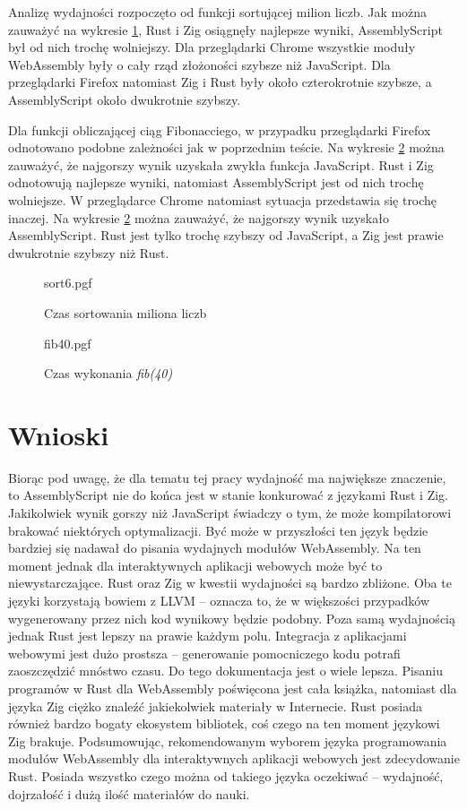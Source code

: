 \documentclass[language=polish,type=master]{aghmodern}
\begin{document}
Analizę wydajności rozpoczęto od funkcji sortującej milion liczb.
Jak można zauważyć na wykresie \ref{fig:sort6}, Rust i Zig osiągnęły najlepsze wyniki, AssemblyScript był od nich trochę wolniejszy.
Dla przeglądarki Chrome wszystkie moduły WebAssembly były o cały rząd złożoności szybsze niż JavaScript.
Dla przeglądarki Firefox natomiast Zig i Rust były około czterokrotnie szybsze, a AssemblyScript około dwukrotnie szybszy.

Dla funkcji obliczającej ciąg Fibonacciego, w przypadku przeglądarki Firefox odnotowano podobne zależności jak w poprzednim teście.
Na wykresie \ref{fig:fib40} można zauważyć, że najgorszy wynik uzyskała zwykła funkcja JavaScript.
Rust i Zig odnotowują najlepsze wyniki, natomiast AssemblyScript jest od nich trochę wolniejsze.
W przeglądarce Chrome natomiast sytuacja przedstawia się trochę inaczej.
Na wykresie \ref{fig:fib40} można zauważyć, że najgorszy wynik uzyskało AssemblyScript.
Rust jest tylko trochę szybszy od JavaScript, a Zig jest prawie dwukrotnie szybszy niż Rust.

\begin{figure}[H]
    \centering
    {sort6.pgf}
    \caption{Czas sortowania miliona liczb}
    \label{fig:sort6}
\end{figure}

\begin{figure}[H]
    \centering
    {fib40.pgf}
    \caption{Czas wykonania \emph{fib(40)}}
    \label{fig:fib40}
\end{figure}

\section{Wnioski}
Biorąc pod uwagę, że dla tematu tej pracy wydajność ma największe znaczenie, to AssemblyScript nie do końca jest w stanie konkurować z językami Rust i Zig.
Jakikolwiek wynik gorszy niż JavaScript świadczy o tym, że może kompilatorowi brakować niektórych optymalizacji.
Być może w przyszłości ten język będzie bardziej się nadawał do pisania wydajnych modułów WebAssembly.
Na ten moment jednak dla interaktywnych aplikacji webowych może być to niewystarczające.
Rust oraz Zig w kwestii wydajności są bardzo zbliżone.
Oba te języki korzystają bowiem z LLVM -- oznacza to, że w większości przypadków wygenerowany przez nich kod wynikowy będzie podobny.
Poza samą wydajnością jednak Rust jest lepszy na prawie każdym polu.
Integracja z aplikacjami webowymi jest dużo prostsza -- generowanie pomocniczego kodu potrafi zaoszczędzić mnóstwo czasu.
Do tego dokumentacja jest o wiele lepsza.
Pisaniu programów w Rust dla WebAssembly poświęcona jest cała książka, natomiast dla języka Zig ciężko znaleźć jakiekolwiek materiały w Internecie.
Rust posiada również bardzo bogaty ekosystem bibliotek, coś czego na ten moment językowi Zig brakuje.
Podsumowując, rekomendowanym wyborem języka programowania modułów WebAssembly dla interaktywnych aplikacji webowych jest zdecydowanie Rust.
Posiada wszystko czego można od takiego języka oczekiwać -- wydajność, dojrzałość i dużą ilość materiałów do nauki.
\end{document}
